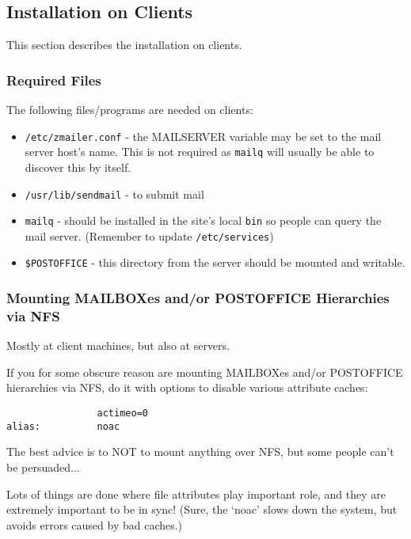 \subsection{Installation on Clients}

This section describes the installation on clients.


\subsubsection{Required Files}

The following files/programs are needed on clients:
\begin{itemize}
\item {\tt /etc/zmailer.conf} - the MAILSERVER variable may be set to the
mail server host's name.  This is not required as {\tt mailq} will usually be able
to discover this by itself.
\item {\tt /usr/lib/sendmail} - to submit mail
\item {\tt mailq} - should be installed in the site's local
{\tt bin} so people can query the mail server. (Remember to update {\tt /etc/services})
\item {\tt \$POSTOFFICE} - this directory from the server should be mounted and writable.
\end{itemize}





\subsubsection{Mounting MAILBOXes and/or POSTOFFICE Hierarchies via NFS}

Mostly at client machines, but also at servers.

If you for some obscure reason are mounting MAILBOXes
and/or POSTOFFICE hierarchies via NFS, do it with
options to disable various attribute caches:
\begin{tscreen}
\begin{verbatim}
                actimeo=0
alias:          noac
\end{verbatim}
\end{tscreen}

The best advice is to NOT to mount anything over NFS,
but some people can't be persuaded...

Lots of things are done where file attributes play important
role, and they are extremely important to be in sync!
(Sure, the `noac' slows down the system, but avoids errors
caused by bad caches.)

